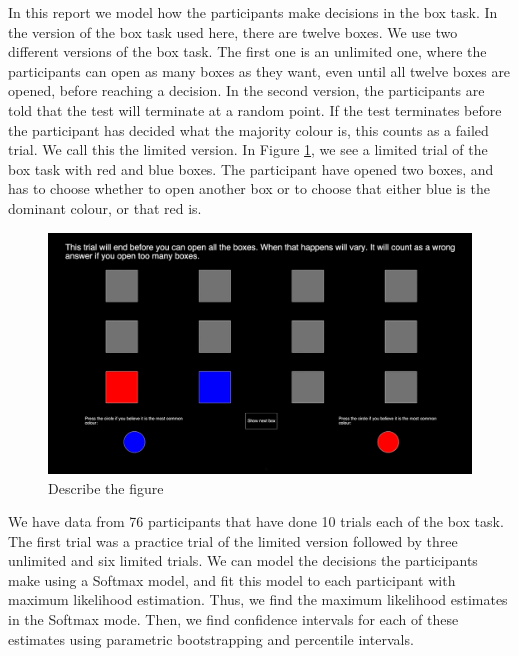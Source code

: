 In this report we model how the participants make decisions in the box task. In the version of the box task used here, there are twelve boxes. We use two different versions of the box task. The first one is an unlimited one, where the participants can open as many boxes as they want, even until all twelve boxes are opened, before reaching a decision. In the second version, the participants are told that the test will terminate at a random point. If the test terminates before the participant has decided what the majority colour is, this counts as a failed trial. We call this the limited version. In Figure \ref{picture_of_box_task}, we see a limited trial of the box task with red and blue boxes. The participant have opened two boxes, and has to choose whether to open another box or to choose that either blue is the dominant colour, or that red is. 

\begin{figure}
    \centering
    \includegraphics[scale=0.486]{Sections/Box task 2.png}
    \caption[A Limited Trial of the Box Task Visualised]{Describe the figure}
    \label{picture_of_box_task}
\end{figure}

We have data from 76 participants that have done 10 trials each of the box task. The first trial was a practice trial of the limited version followed by three unlimited and six limited trials. We can model the decisions the participants make using a Softmax model, and fit this model to each participant with maximum likelihood estimation. Thus, we find the maximum likelihood estimates in the Softmax mode. Then, we find confidence intervals for each of these estimates using parametric bootstrapping and percentile intervals. 

